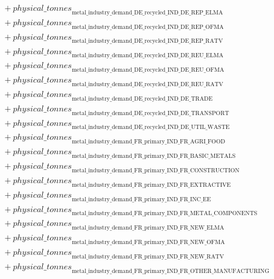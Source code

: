 \documentclass[11pt]{article}
\begin{document}
\begin{align*}
&\quad {}+ {physical\_tonnes}_{\text{metal\_industry\_demand\_DE\_recycled\_IND\_DE\_REP\_ELMA}}\\
&\quad {}+ {physical\_tonnes}_{\text{metal\_industry\_demand\_DE\_recycled\_IND\_DE\_REP\_OFMA}}\\
&\quad {}+ {physical\_tonnes}_{\text{metal\_industry\_demand\_DE\_recycled\_IND\_DE\_REP\_RATV}}\\
&\quad {}+ {physical\_tonnes}_{\text{metal\_industry\_demand\_DE\_recycled\_IND\_DE\_REU\_ELMA}}\\
&\quad {}+ {physical\_tonnes}_{\text{metal\_industry\_demand\_DE\_recycled\_IND\_DE\_REU\_OFMA}}\\
&\quad {}+ {physical\_tonnes}_{\text{metal\_industry\_demand\_DE\_recycled\_IND\_DE\_REU\_RATV}}\\
&\quad {}+ {physical\_tonnes}_{\text{metal\_industry\_demand\_DE\_recycled\_IND\_DE\_TRADE}}\\
&\quad {}+ {physical\_tonnes}_{\text{metal\_industry\_demand\_DE\_recycled\_IND\_DE\_TRANSPORT}}\\
&\quad {}+ {physical\_tonnes}_{\text{metal\_industry\_demand\_DE\_recycled\_IND\_DE\_UTIL\_WASTE}}\\
&\quad {}+ {physical\_tonnes}_{\text{metal\_industry\_demand\_FR\_primary\_IND\_FR\_AGRI\_FOOD}}\\
&\quad {}+ {physical\_tonnes}_{\text{metal\_industry\_demand\_FR\_primary\_IND\_FR\_BASIC\_METALS}}\\
&\quad {}+ {physical\_tonnes}_{\text{metal\_industry\_demand\_FR\_primary\_IND\_FR\_CONSTRUCTION}}\\
&\quad {}+ {physical\_tonnes}_{\text{metal\_industry\_demand\_FR\_primary\_IND\_FR\_EXTRACTIVE}}\\
&\quad {}+ {physical\_tonnes}_{\text{metal\_industry\_demand\_FR\_primary\_IND\_FR\_INC\_EE}}\\
&\quad {}+ {physical\_tonnes}_{\text{metal\_industry\_demand\_FR\_primary\_IND\_FR\_METAL\_COMPONENTS}}\\
&\quad {}+ {physical\_tonnes}_{\text{metal\_industry\_demand\_FR\_primary\_IND\_FR\_NEW\_ELMA}}\\
&\quad {}+ {physical\_tonnes}_{\text{metal\_industry\_demand\_FR\_primary\_IND\_FR\_NEW\_OFMA}}\\
&\quad {}+ {physical\_tonnes}_{\text{metal\_industry\_demand\_FR\_primary\_IND\_FR\_NEW\_RATV}}\\
&\quad {}+ {physical\_tonnes}_{\text{metal\_industry\_demand\_FR\_primary\_IND\_FR\_OTHER\_MANUFACTURING}}\\

\end{align*}
\end{document}
